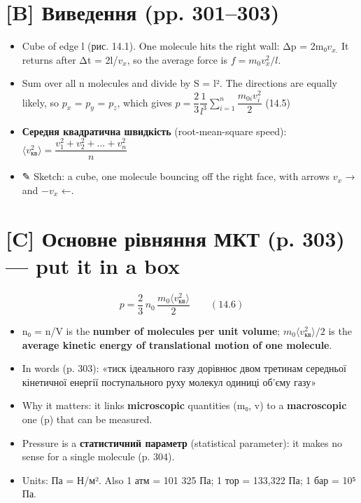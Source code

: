 \documentclass[11pt,a4paper,oneside]{book}
\newcommand{\pen}{{\sffamily\color{accent}✎}}
\begin{document}
\section*{[B] Виведення (pp. 301–303)}
\begin{itemize}
\item Cube of edge l (рис. 14.1). One molecule hits the right wall: Δp = 2m₀$v_{x.}$ It returns after Δt = 2l/$v_{x}$, so the average force is $f = m_0v_x^2/l$.
\item Sum over all n molecules and divide by S = l². The directions are equally likely, so $p_{x}$ = $p_{y}$ = $p_{z}$, which gives
$p = \dfrac23\dfrac1{l^3}\sum_{i=1}^n\dfrac{m_{0i}v_i^2}{2}$ (14.5)
\item \textbf{Середня квадратична швидкість} (root-mean-square speed): $\langle v_{\text{кв}}^2\rangle = \dfrac{v_1^2+v_2^2+\ldots+v_n^2}{n}$
\item \pen{} Sketch: a cube, one molecule bouncing off the right face, with arrows $v_{x}$ → and −$v_{x}$ ←.
\end{itemize}

\section*{[C] Основне рівняння МКТ (p. 303) — put it in a box}
\[p = \frac23\,n_0\,\frac{m_0\langle v_{\text{кв}}^2\rangle}{2}\qquad(14.6)\]
\begin{itemize}
\item n₀ = n/V is the \textbf{number of molecules per unit volume}; $m_0\langle v_{\text{кв}}^2\rangle/2$ is the \textbf{average kinetic energy of translational motion of one molecule}.
\item In words (p. 303): «тиск ідеального газу дорівнює двом третинам середньої кінетичної енергії поступального руху молекул одиниці об'єму газу»
\item Why it matters: it links \textbf{microscopic} quantities (m₀, v) to a \textbf{macroscopic} one (p) that can be measured.
\item Pressure is a \textbf{статистичний параметр} (statistical parameter): it makes no sense for a single molecule (p. 304).
\item Units: Па = Н/м². Also 1 атм = 101 325 Па; 1 тор = 133,322 Па; 1 бар = 10⁵ Па.
\end{itemize}
\end{document}
